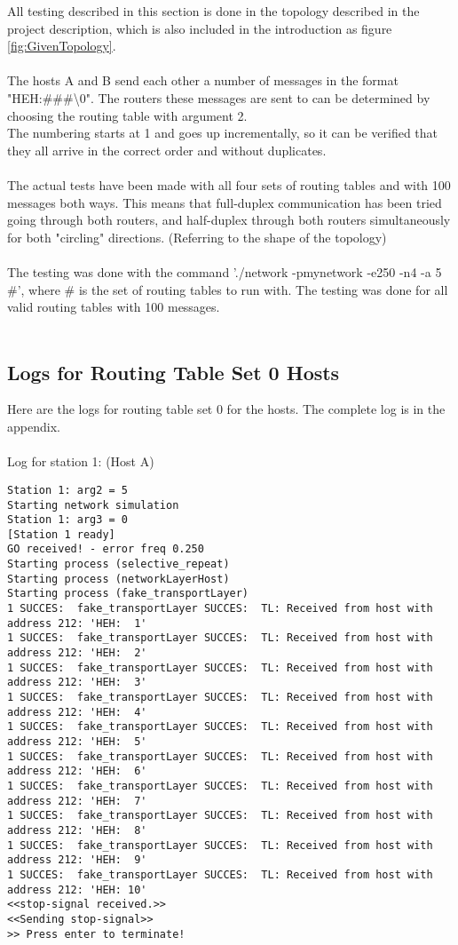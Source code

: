 All testing described in this section is done in the topology described in the project description, which is also included in the introduction as figure \ref{fig:GivenTopology}.\\
\\
The hosts A and B send each other a number of messages in the format "HEH:\#\#\#\textbackslash0". The routers these messages are sent to can be determined by choosing the routing table with argument 2.\\
The numbering starts at 1 and goes up incrementally, so it can be verified that they all arrive in the correct order and without duplicates.\\
\\
The actual tests have been made with all four sets of routing tables and with 100 messages both ways. This means that full-duplex communication has been tried going through both routers, and half-duplex through both routers simultaneously for both "circling" directions. (Referring to the shape of the topology)\\
\\
The testing was done with the command './network -pmynetwork -e250 -n4 -a 5 \#', where \# is the set of routing tables to run with. The testing was done for all valid routing tables with 100 messages.\\
\\

\subsection{Logs for Routing Table Set 0 Hosts}
Here are the logs for routing table set 0 for the hosts. The complete log is in the appendix.\\
\\

Log for station 1: (Host A)
\begin{lstlisting}[breaklines=true]
Station 1: arg2 = 5
Starting network simulation
Station 1: arg3 = 0
[Station 1 ready]
GO received! - error freq 0.250
Starting process (selective_repeat)
Starting process (networkLayerHost)
Starting process (fake_transportLayer)
1 SUCCES:  fake_transportLayer SUCCES:  TL: Received from host with address 212: 'HEH:  1'
1 SUCCES:  fake_transportLayer SUCCES:  TL: Received from host with address 212: 'HEH:  2'
1 SUCCES:  fake_transportLayer SUCCES:  TL: Received from host with address 212: 'HEH:  3'
1 SUCCES:  fake_transportLayer SUCCES:  TL: Received from host with address 212: 'HEH:  4'
1 SUCCES:  fake_transportLayer SUCCES:  TL: Received from host with address 212: 'HEH:  5'
1 SUCCES:  fake_transportLayer SUCCES:  TL: Received from host with address 212: 'HEH:  6'
1 SUCCES:  fake_transportLayer SUCCES:  TL: Received from host with address 212: 'HEH:  7'
1 SUCCES:  fake_transportLayer SUCCES:  TL: Received from host with address 212: 'HEH:  8'
1 SUCCES:  fake_transportLayer SUCCES:  TL: Received from host with address 212: 'HEH:  9'
1 SUCCES:  fake_transportLayer SUCCES:  TL: Received from host with address 212: 'HEH: 10'
<<stop-signal received.>>
<<Sending stop-signal>>
>> Press enter to terminate!
\end{lstlisting}


